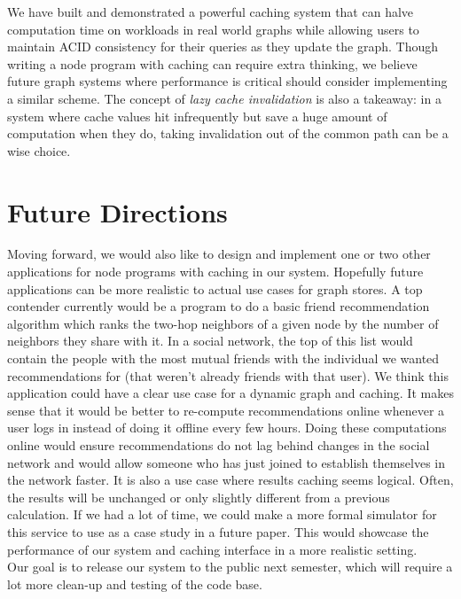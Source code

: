 \documentclass[letterpaper,twocolumn,11pt,tight]{article}
\begin{document}
We have built and demonstrated a powerful caching system that can halve computation time on workloads in real world graphs while allowing users to maintain ACID consistency for their queries as they update the graph. Though writing a node program with caching can require extra thinking, we believe future graph systems where performance is critical should consider implementing a similar scheme. The concept of \emph{lazy cache invalidation} is also a takeaway: in a system where cache values hit infrequently but save a huge amount of computation when they do, taking invalidation out of the common path can be a wise choice.

\section{Future Directions}\label{sec:future}
Moving forward, we would also like to design and implement one or two other applications for node programs with caching in our system. Hopefully future applications can be more realistic to actual use cases for graph stores.
A top contender currently would be a program to do a basic friend recommendation algorithm which ranks the two-hop neighbors of a given node by the number of neighbors they share with it.
In a social network, the top of this list would contain the people with the most mutual friends with the individual we wanted recommendations for (that weren't already friends with that user).
We think this application could have a clear use case for a dynamic graph and caching. It makes sense that it would be better to re-compute recommendations online whenever a user logs in instead of doing it offline every few hours.
Doing these computations online would ensure recommendations do not lag behind changes in the social network and would allow someone who has just joined to establish themselves in the network faster. It is also a use case where results caching seems logical. Often, the results will be unchanged or only slightly different from a previous calculation.
 If we had a lot of time, we could make a more formal simulator for this service to use as a case study in a future paper. This would showcase the performance of our system and caching interface in a more realistic setting.
\\

Our goal is to release our system to the public next semester, which will require a lot more clean-up and testing of the code base.

\footnotesize

\end{document}
